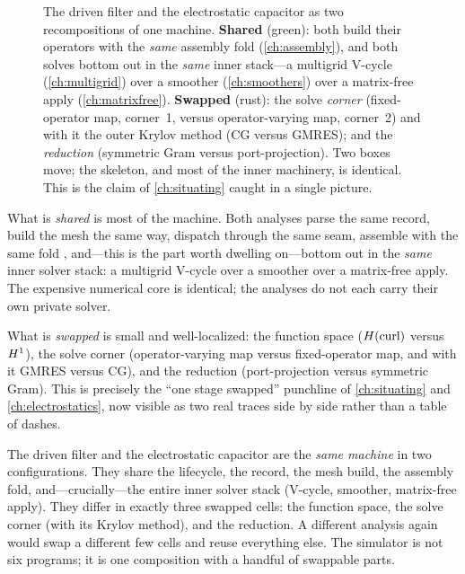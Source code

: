 \begin{figure}[t]
\caption[Two analyses, one machine]{The driven filter and the electrostatic
capacitor as two recompositions of one machine. \textbf{Shared} (green): both
build their operators with the \emph{same} assembly fold 
(\cref{ch:assembly}), and both solves bottom out in the \emph{same} inner
stack---a multigrid V-cycle (\cref{ch:multigrid}) over a smoother
(\cref{ch:smoothers}) over a matrix-free apply (\cref{ch:matrixfree}).
\textbf{Swapped} (rust): the solve \emph{corner} (fixed-operator map, corner~1,
versus operator-varying map, corner~2) and with it the outer Krylov method (CG
versus GMRES); and the \emph{reduction} (symmetric Gram versus port-projection).
Two boxes move; the skeleton, and most of the inner machinery, is identical. This
is the claim of \cref{ch:situating} caught in a single picture.}
\label{fig:trace-contrast}
\end{figure}

What is \emph{shared} is most of the machine. Both analyses parse the same
 record, build the mesh the same way, dispatch through the same seam,
assemble with the same fold , and---this is the part worth
dwelling on---bottom out in the \emph{same} inner solver stack: a multigrid
V-cycle over a smoother over a matrix-free apply. The expensive numerical core is
identical; the analyses do not each carry their own private solver.

What is \emph{swapped} is small and well-localized: the function space ($H(\mathrm{curl})$
versus $H^1$), the solve corner (operator-varying map versus fixed-operator map,
and with it GMRES versus CG), and the reduction (port-projection versus symmetric
Gram). This is precisely the ``one stage swapped'' punchline of
\cref{ch:situating} and \cref{ch:electrostatics}, now visible as two real traces
side by side rather than a table of dashes.

\begin{keyidea}
The driven filter and the electrostatic capacitor are the \emph{same machine} in
two configurations. They share the lifecycle, the  record, the mesh
build, the assembly fold, and---crucially---the entire inner solver stack
(V-cycle, smoother, matrix-free apply). They differ in exactly three swapped
cells: the function space, the solve corner (with its Krylov method), and the
reduction. A different analysis again would swap a different few cells and reuse
everything else. The simulator is not six programs; it is one composition with a
handful of swappable parts.
\end{keyidea}

